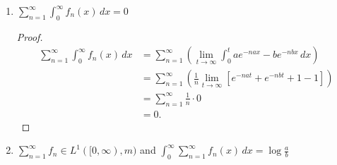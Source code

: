\documentclass[11pt,oneside,english]{amsart}
\theoremstyle{definition}
\newcommand{\lom}[2]{\lim_{{#1}\rightarrow{#2}}}
\begin{document}
\begin{enumerate}
\begin{enumerate}
\begin{proof}
\begin{align*}
\int_0^\infty|f_n(x)|\,dx&=\int_0^{p_n}be^{-nbx}-ae^{-nax}\,dx+\lom{t}{\infty}\int_{p_n}^tae^{-nax}-be^{-nbx}\,dx\\[2mm]
&=\left[-\frac{e^{-nbx}}{n}+\frac{e^{-nax}}{n}\right]_{x=0}^{x=p_n}+\lom{t}{\infty}\left[-\frac{e^{-nax}}{n}+\frac{e^{-nbx}}{n}\right]_{x=p_n}^{x=t}\\[2mm]
&=\frac{1}{n}\left(-e^{-nbp_n}+e^{-ap_n}+1-1\right)+\frac{1}{n}\lom{t}{\infty}\left(-e^{-nat}+e^{-nbt}+e^{-nap_n}-e^{-nbp_n}\right)\\[2mm]
&=\frac{2}{n}\left(e^{-nap_n}-e^{-nbp_n}\right)\\[2mm]
&=\frac{2}{n}\left(e^{-na\cdot\frac{1}{n}\cdot\frac{\log \frac{a}{b}}{a-b}}-e^{-nb\cdot\frac{1}{n}\cdot\frac{\log \frac{a}{b}}{a-b}}\right)\\[2mm]
&=\frac{2}{n}\left(e^{\log\frac{a}{b}\cdot\frac{a}{b-a}}-e^{\log\frac{a}{b}\cdot\frac{b}{b-a}}\right)\\[2mm]
&=\frac{2}{n}\left(\left(\frac{a}{b}\right)^{\frac{a}{b-a}}-\left(\frac{a}{b}\right)^{\frac{b}{b-a}}\right).
\end{align*}

Consequently,

\[
\sum_{n=1}^\infty\int_0^\infty|f_n(x)|\,dx=\sum_{n=1}^\infty\frac{2}{n}\left(\left(\frac{a}{b}\right)^{\frac{a}{b-a}}-\left(\frac{a}{b}\right)^{\frac{b}{b-a}}\right)=\left(\left(\frac{a}{b}\right)^{\frac{a}{b-a}}-\left(\frac{a}{b}\right)^{\frac{b}{b-a}}\right) \sum_{n=1}^\infty \frac{2}{n}=\infty.
\]
\end{proof}

\item $\displaystyle \sum_{n=1}^\infty\int_0^\infty f_n(x)\,dx=0$

\begin{proof}
\begin{align*}
\sum_{n=1}^\infty\int_0^\infty f_n(x)\,dx&=\sum_{n=1}^\infty\left(\lom{t}{\infty}\int_0^t ae^{-nax}-be^{-nbx}\,dx\right)\\[2mm]
&=\sum_{n=1}^\infty\left(\frac{1}{n}\lom{t}{\infty}\left[e^{-nat}+e^{-nbt}+1-1\right]\right)\\[2mm]
&=\sum_{n=1}^\infty\frac{1}{n}\cdot0\\[2mm]
&=0.
\end{align*}
\end{proof}

\item $\displaystyle \sum_{n=1}^\infty f_n\in L^1([0,\infty),m)$ and $\displaystyle \int_0^\infty\sum_{n=1}^\infty f_n(x)\,dx =\log\frac{a}{b}$


\end{enumerate}
\end{enumerate}
\end{document}
